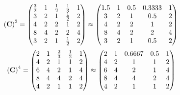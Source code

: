 \documentclass[10pt,a4paper]{article}
\begin{document}
	\[
		\left(\bold{C}\right)^{3} = 
		\begin{pmatrix}
			\frac{{3}} {{2}} & {1} {} & \frac{1} {{2}} & \frac{1} {{3}} & {1} {} \\
			{{3}} {} & {{2}} {} & {1} {} & \frac{1} {{2}} & {{2}} {} \\
			{{4}} {} & {{2}} {} & {{2}} {} & {1} {} & {{2}} {} \\
			{{8}} {} & {{4}} {} & {{2}} {} & {{2}} {} & {{4}} {} \\
			{{3}} {} & {{2}} {} & {1} {} & \frac{1} {{2}} & {{2}} {} \\
		\end{pmatrix}
		\approx
		\begin{pmatrix}
			1.5      & 1        & 0.5      & 0.3333   & 1        \\
			3        & 2        & 1        & 0.5      & 2        \\
			4        & 2        & 2        & 1        & 2        \\
			8        & 4        & 2        & 2        & 4        \\
			3        & 2        & 1        & 0.5      & 2        \\
		\end{pmatrix}
	\]
	\[
		\left(\bold{C}\right)^{4} = 
		\begin{pmatrix}
			{{2}} {} & {1} {} & \frac{{2}} {{3}} & \frac{1} {{2}} & {1} {} \\
			{{4}} {} & {{2}} {} & {1} {} & {1} {} & {{2}} {} \\
			{{6}} {} & {{4}} {} & {{2}} {} & {1} {} & {{4}} {} \\
			{{8}} {} & {{4}} {} & {{4}} {} & {{2}} {} & {{4}} {} \\
			{{4}} {} & {{2}} {} & {1} {} & {1} {} & {{2}} {} \\
		\end{pmatrix}
		\approx
		\begin{pmatrix}
			2        & 1        & 0.6667   & 0.5      & 1        \\
			4        & 2        & 1        & 1        & 2        \\
			6        & 4        & 2        & 1        & 4        \\
			8        & 4        & 4        & 2        & 4        \\
			4        & 2        & 1        & 1        & 2        \\
		\end{pmatrix}
	\]
\end{document}
